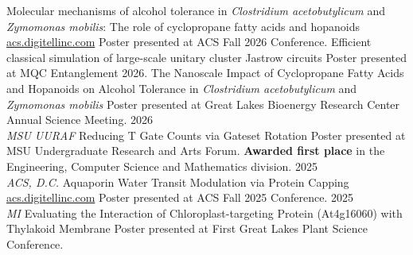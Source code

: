 \documentclass[9pt]{developercv} %
\let\oldhref\href
\newcommand{\linkul}[1]{\setbox0\hbox{#1}\rlap{\textcolor{black!35}{\rule[-1.6pt]{\wd0}{0.3pt}}}\box0}
\renewcommand{\href}[2]{\oldhref{#1}{\linkul{#2}}}
\begin{document}
\newpage
{}
\begin{entrylist}
		{Molecular mechanisms of alcohol tolerance in \textit{Clostridium acetobutylicum} and \textit{Zymomonas mobilis}: The role of cyclopropane fatty acids and hopanoids}
		{\href{https://acs.digitellinc.com/p/s/molecular-mechanisms-of-alcohol-tolerance-in-clostridium-acetobutylicum-and-zymomonas-mobilis-the-role-of-cyclopropane-fatty-acids-and-hopanoids-661279}{acs.digitellinc.com}}
		{Poster presented at ACS Fall 2026 Conference.}
		{Efficient classical simulation of large-scale unitary cluster Jastrow circuits}
		{}
		{Poster presented at MQC Entanglement 2026.}
		{The Nanoscale Impact of Cyclopropane Fatty Acids and Hopanoids on Alcohol Tolerance in \textit{Clostridium acetobutylicum} and \textit{Zymomonas mobilis}}
		{}
		{Poster presented at Great Lakes Bioenergy Research Center Annual Science Meeting.}
	\entry
		{2026 \\ \vspace{4pt}\color{gray} \textit{MSU UURAF}}
		{Reducing T Gate Counts via Gateset Rotation}
		{}
		{Poster presented at MSU Undergraduate Research and Arts Forum. \textbf{Awarded first place} in the Engineering, Computer Science and Mathematics division.}
	\entry 
		{2025 \\ \vspace{4pt}\color{gray} \textit{ACS, D.C.}}
		{Aquaporin Water Transit Modulation via Protein Capping}
		{\href{https://acs.digitellinc.com/p/s/aquaporin-water-transit-modulation-via-protein-capping-638984}{acs.digitellinc.com}}
		{Poster presented at ACS Fall 2025 Conference.}
	\entry 
		{2025 \\ \vspace{4pt}\color{gray} \textit{MI}}
		{Evaluating the Interaction of Chloroplast-targeting Protein (At4g16060) with
		Thylakoid Membrane}
		{}
		{Poster presented at First Great Lakes Plant Science Conference.}
\end{entrylist}
\vspace*{-7pt}
\end{document}
